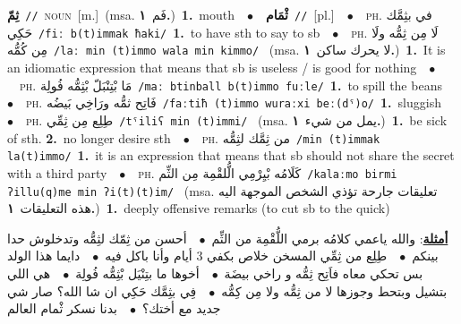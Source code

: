 \documentclass[10pt,a4paper,twoside]{article} %
\begin{document}
\begin{multicols}{2}
{\setlength\topsep{0pt}\textbf{\foreignlanguage{arabic}{ثِمّ}}\ {\color{gray}\texttt{//}\color{black}}\ \textsc{noun}\ [m.]\ \color{gray}(msa. \foreignlanguage{arabic}{فَم}~\foreignlanguage{arabic}{\textbf{١.}})\color{black}\ \textbf{1.}~mouth\ \ $\bullet$\ \ \setlength\topsep{0pt}\textbf{\foreignlanguage{arabic}{ثْمَام}}\ {\color{gray}\texttt{//}\color{black}}\ [pl.]\ \ $\bullet$\ \ \textsc{ph.} \color{gray} \foreignlanguage{arabic}{في بثِمَّك حَكِي}\color{black}\ {\color{gray}\texttt{/{\sffamily fiː b(t)immak ħaki}/}\color{black}}\ \textbf{1.}~to have sth to say to sb\ \ $\bullet$\ \ \textsc{ph.} \color{gray} \foreignlanguage{arabic}{لَا مِن ثِمُّه ولَا مِن كُمُّه}\color{black}\ {\color{gray}\texttt{/{\sffamily laː min (t)immo wala min kimmo}/}\color{black}}\ \color{gray} (msa. \foreignlanguage{arabic}{لا يحرك ساكن}~\foreignlanguage{arabic}{\textbf{١.}})\color{black}\ \textbf{1.}~It is an idiomatic expression that means that sb is useless / is good for nothing\ \ $\bullet$\ \ \textsc{ph.} \color{gray} \foreignlanguage{arabic}{مَا بْتِنْبَلّ بْثِمُّه فُولِة}\color{black}\ {\color{gray}\texttt{/{\sffamily maː btinball b(t)immo fuːle}/}\color{black}}\ \textbf{1.}~to spill the beans\ \ $\bullet$\ \ \textsc{ph.} \color{gray} \foreignlanguage{arabic}{فَاتِح ثمُّه ورَاخِي بَيضُه}\color{black}\ {\color{gray}\texttt{/{\sffamily faːtiħ (t)immo wuraːxi beː(dˤ)o}/}\color{black}}\ \textbf{1.}~sluggish\ \ $\bullet$\ \ \textsc{ph.} \color{gray} \foreignlanguage{arabic}{طِلِع مِن ثِمِّي}\color{black}\ {\color{gray}\texttt{/{\sffamily tˤiliʕ min (t)immi}/}\color{black}}\ \color{gray} (msa. \foreignlanguage{arabic}{يمل من شيء}~\foreignlanguage{arabic}{\textbf{١.}})\color{black}\ \textbf{1.}~be sick of sth.  \textbf{2.}~no longer desire sth\ \ $\bullet$\ \ \textsc{ph.} \color{gray} \foreignlanguage{arabic}{من ثِمَّك لثِمُّه}\color{black}\ {\color{gray}\texttt{/{\sffamily min (t)immak la(t)immo}/}\color{black}}\ \textbf{1.}~it is an expression that means that sb should not share the secret with a third party\ \ $\bullet$\ \ \textsc{ph.} \color{gray} \foreignlanguage{arabic}{كَلَامُه بْيِرْمِي الُّلقْمِة مِن الثِّم}\color{black}\ {\color{gray}\texttt{/{\sffamily kalaːmo birmi ʔillu(q)me min ʔi(t)(t)im}/}\color{black}}\ \color{gray} (msa. \foreignlanguage{arabic}{تعليقات جارحة تؤذي الشخص الموجهة اليه هذه التعليقات}~\foreignlanguage{arabic}{\textbf{١.}})\color{black}\ \textbf{1.}~deeply offensive remarks (to cut sb to the quick)\  \begin{flushright}\color{gray}\foreignlanguage{arabic}{\textbf{\underline{\foreignlanguage{arabic}{أمثلة}}}: والله ياعمي كلامُه برمي اللُّقْمِة من الثِّم\ $\bullet$\ \  أحسن من ثِمّك لثِمُّه وتدخلوش حدا بينكم\ $\bullet$\ \  طِلِع من ثِمِّي المسخن خلاص بكفي 3 أيام وأنا باكل فيه\ $\bullet$\ \  دايما هذا الولد بس تحكي معاه فاَتِح ثِمُّه و راخي بيضَة\ $\bullet$\ \  أخوها ما بتِنْيَل بْثِمُّه فُولِة\ $\bullet$\ \  هي اللي بتشيل وبتحط وجوزها لا من ثِمُّه ولا مِن كِمُّه\ $\bullet$\ \  فِي بثِمَّك حَكِي ان شا الله؟ صار شي جديد مع أختك؟\ $\bullet$\ \  بدنا نسكر ثْمام العالم}\end{flushright}\color{black}} \vspace{2mm}


\end{multicols}
\end{document}
